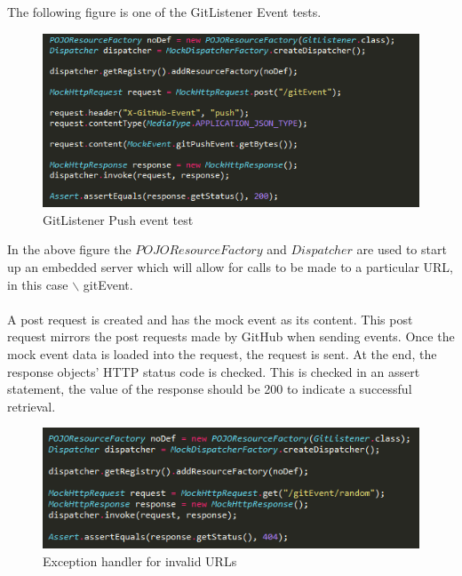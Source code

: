 \documentclass[11pt,a4paper]{article}
\begin{document}
The following figure is one of the GitListener Event tests.

\begin{figure}[H]
	\begin{center}
		\includegraphics[scale=1.0]{../Images/sample1.PNG}
		\caption{GitListener Push event test}
	\end{center}
\end{figure}
\noindent
In the above figure the $POJOResourceFactory$ and $Dispatcher$ are used to start up an embedded server which will allow for calls to be made to a particular URL, in this case $\backslash$ gitEvent. \\
\\
A post request is created and has the mock event as its content. This post request mirrors the post requests made by GitHub when sending events. Once the mock event data is loaded into the request, the request is sent. At the end, the response objects' HTTP status code is checked. This is checked in an assert statement, the value of the response should be 200 to indicate a successful retrieval. \\

\begin{figure}[H]
	\begin{center}
		\includegraphics[scale=1.0]{../Images/sample2.PNG}
		\caption{Exception handler for invalid URLs}
	\end{center}
\end{figure}
\end{document}
